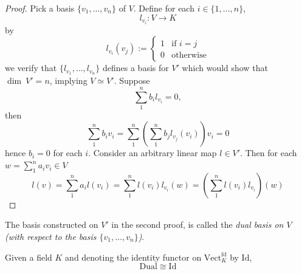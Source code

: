     \begin{proof}
        Pick a basis $\{v_1,\dots,v_n\}$ of $V$. Define for each $i\in \{1,\dots,n\}$,
        $$
            l_{v_i} : V\rightarrow K
        $$
        by 
        $$
            l_{v_i}(v_j) := 
            \begin{cases}
                1 & \text{if } i=j\\
                0 & \text{otherwise}
            \end{cases}
        $$
        we verify that $\{l_{v_1},\dots,l_{v_n}\}$ defines a basis for $V'$ which would show that $\dim\ V' = n$, implying $V\simeq V'$. Suppose
        $$
            \sum_1^n b_il_{v_i} = 0, 
        $$
        then 
        $$
            \sum_1^n b_iv_i = \sum_1^n\left(\sum_1^n b_jl_{v_j}(v_i)\right)v_i = 0 
        $$
        hence $b_i=0$ for each $i$. Consider an arbitrary linear map $l\in V'$. Then for each $w=\sum_1^n a_iv_i\in V$
        $$
            l(v)= \sum_1^n a_il(v_i)= \sum_1^n l(v_i)l_{v_i}(w) = \left(\sum_1^n l(v_i)l_{v_i}\right)(w)
        $$
    \end{proof}
    \begin{remark}
        The basis constructed on $V'$ in the second proof, is called the \emph{dual basis on $V$ (with respect to the basis $\{v_1,\dots,v_n\}$)}.
    \end{remark}
    \begin{proposition}
        Given a field $K$ and denoting the identity functor on $\mathrm{Vect}_K^{\mathrm{fd}}$ by $\mathrm{Id}$, 
        $$
            \mathrm{Dual} \cong \mathrm{Id}
        $$
    \end{proposition}
